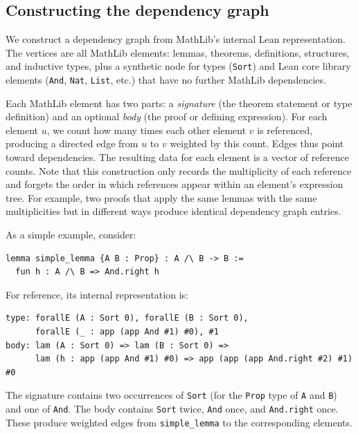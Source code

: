 \documentclass[12pt]{amsart}
\theoremstyle{definition}
\theoremstyle{remark}
\newcommand{\leaninline}[1]{\lstinline[style=lean]!#1!}
\begin{document}
\subsection{Constructing the dependency graph}

We construct a dependency graph from MathLib's internal Lean representation.
The vertices are all MathLib elements: lemmas, theorems, definitions, structures, and inductive types, plus a synthetic node for types (\leaninline{Sort}) and Lean core library elements (\leaninline{And}, \leaninline{Nat}, \leaninline{List}, etc.) that have no further MathLib dependencies.

Each MathLib element has two parts: a \emph{signature} (the theorem statement or type definition) and an optional \emph{body} (the proof or defining expression).
For each element $u$, we count how many times each other element $v$ is referenced, producing a directed edge from $u$ to $v$ weighted by this count.
Edges thus point toward dependencies.
The resulting data for each element is a vector of reference counts.
Note that this construction only records the multiplicity of each reference and forgets the order in which references appear within an element's expression tree.
For example, two proofs that apply the same lemmas with the same multiplicities but in different ways
produce identical dependency graph entries.

As a simple example, consider:
\begin{lstlisting}
lemma simple_lemma {A B : Prop} : A /\ B -> B :=
  fun h : A /\ B => And.right h
\end{lstlisting}
For reference, its internal representation is:
\begin{lstlisting}
type: forallE (A : Sort 0), forallE (B : Sort 0), 
      forallE (_ : app (app And #1) #0), #1
body: lam (A : Sort 0) => lam (B : Sort 0) => 
      lam (h : app (app And #1) #0) => app (app (app And.right #2) #1) #0
\end{lstlisting}
The signature contains two occurrences of \leaninline{Sort} (for the \leaninline{Prop} type of \leaninline{A} and \leaninline{B}) and one of \leaninline{And}.
The body contains \leaninline{Sort} twice, \leaninline{And} once, and \leaninline{And.right} once.
These produce weighted edges from \leaninline{simple_lemma} to the corresponding elements.
\end{document}
